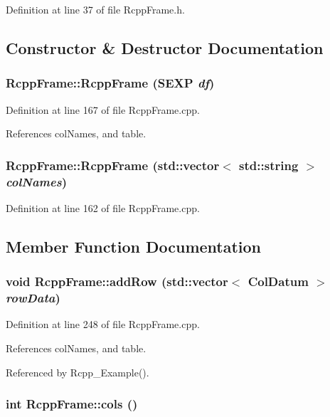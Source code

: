 Definition at line 37 of file RcppFrame.h.

\subsection{Constructor \& Destructor Documentation}
\hypertarget{classRcppFrame_a2aad548eb7d3842ea12da3c5a67bbfbc}{
\subsubsection[{RcppFrame}]{\setlength{\rightskip}{0pt plus 5cm}RcppFrame::RcppFrame (SEXP {\em df})}}
\label{classRcppFrame_a2aad548eb7d3842ea12da3c5a67bbfbc}


Definition at line 167 of file RcppFrame.cpp.

References colNames, and table.\hypertarget{classRcppFrame_ad3caf84a0543c0f31a97705be8902358}{
\subsubsection[{RcppFrame}]{\setlength{\rightskip}{0pt plus 5cm}RcppFrame::RcppFrame (std::vector$<$ std::string $>$ {\em colNames})}}
\label{classRcppFrame_ad3caf84a0543c0f31a97705be8902358}


Definition at line 162 of file RcppFrame.cpp.

\subsection{Member Function Documentation}
\hypertarget{classRcppFrame_aae72791527f2947a477633151106f42c}{
\subsubsection[{addRow}]{\setlength{\rightskip}{0pt plus 5cm}void RcppFrame::addRow (std::vector$<$ {\bf ColDatum} $>$ {\em rowData})}}
\label{classRcppFrame_aae72791527f2947a477633151106f42c}


Definition at line 248 of file RcppFrame.cpp.

References colNames, and table.

Referenced by Rcpp\_\-Example().\hypertarget{classRcppFrame_aac33f787068fe1bc6f97b2b4e08c9c5d}{
\subsubsection[{cols}]{\setlength{\rightskip}{0pt plus 5cm}int RcppFrame::cols ()}}
\label{classRcppFrame_aac33f787068fe1bc6f97b2b4e08c9c5d}


